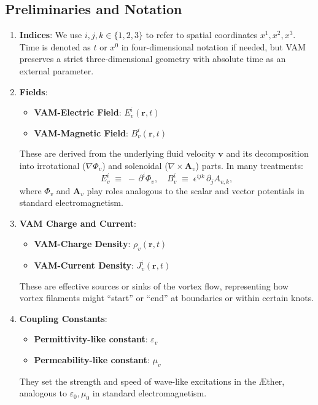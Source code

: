 \documentclass[aps,preprint,superscriptaddress]{revtex4-2}
\begin{document}
    \subsection{Preliminaries and Notation}

    \begin{enumerate}
        \item \textbf{Indices}: We use \(i, j, k \in \{1,2,3\}\) to refer to spatial coordinates \(x^1, x^2, x^3\). Time is denoted as \(t\) or \(x^0\) in four-dimensional notation if needed, but VAM preserves a strict three-dimensional geometry with absolute time as an external parameter.
        \item \textbf{Fields}:
        \begin{itemize}
            \item \textbf{VAM-Electric Field}: \(E_{v}^i(\mathbf{r}, t)\)
            \item \textbf{VAM-Magnetic Field}: \(B_{v}^i(\mathbf{r}, t)\)
        \end{itemize}
    These are derived from the underlying fluid velocity \(\mathbf{v}\) and its decomposition into irrotational (\(\nabla \Phi_v\)) and solenoidal (\(\nabla \times \mathbf{A}_v\)) parts. In many treatments:
    \[
        E_{v}^i \;\equiv\; -\,\partial^i \Phi_v,
        \quad
        B_{v}^i \;\equiv\; \epsilon^{ijk}\,\partial_j A_{v,k},
    \]
    where \(\Phi_v\) and \(\mathbf{A}_v\) play roles analogous to the scalar and vector potentials in standard electromagnetism.
        \item \textbf{VAM Charge and Current}:
        \begin{itemize}
            \item \textbf{VAM-Charge Density}: \(\rho_v(\mathbf{r}, t)\)
            \item \textbf{VAM-Current Density}: \(J_{v}^i(\mathbf{r}, t)\)
        \end{itemize}
    These are effective sources or sinks of the vortex flow, representing how vortex filaments might “start” or “end” at boundaries or within certain knots.
        \item \textbf{Coupling Constants}:
        \begin{itemize}
            \item \textbf{Permittivity-like constant}: \(\varepsilon_v\)
            \item \textbf{Permeability-like constant}: \(\mu_v\)
        \end{itemize}
    They set the strength and speed of wave-like excitations in the Æther, analogous to \(\varepsilon_0, \mu_0\) in standard electromagnetism.
    \end{enumerate}
\end{document}

